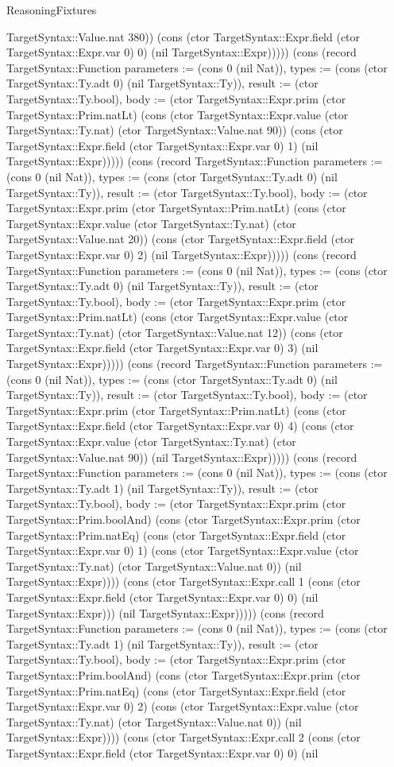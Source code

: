 \begin{lexlean}{ReasoningFixtures}
\begin{semanticmodule}
{TargetSyntax::Value.nat 380)) (cons (ctor TargetSyntax::Expr.field (ctor TargetSyntax::Expr.var 0) 0) (nil TargetSyntax::Expr))))}) (cons (record TargetSyntax::Function {parameters := (cons 0 (nil Nat)), types := (cons (ctor TargetSyntax::Ty.adt 0) (nil TargetSyntax::Ty)), result := (ctor TargetSyntax::Ty.bool), body := (ctor TargetSyntax::Expr.prim (ctor TargetSyntax::Prim.natLt) (cons (ctor TargetSyntax::Expr.value (ctor TargetSyntax::Ty.nat) (ctor TargetSyntax::Value.nat 90)) (cons (ctor TargetSyntax::Expr.field (ctor TargetSyntax::Expr.var 0) 1) (nil TargetSyntax::Expr))))}) (cons (record TargetSyntax::Function {parameters := (cons 0 (nil Nat)), types := (cons (ctor TargetSyntax::Ty.adt 0) (nil TargetSyntax::Ty)), result := (ctor TargetSyntax::Ty.bool), body := (ctor TargetSyntax::Expr.prim (ctor TargetSyntax::Prim.natLt) (cons (ctor TargetSyntax::Expr.value (ctor TargetSyntax::Ty.nat) (ctor TargetSyntax::Value.nat 20)) (cons (ctor TargetSyntax::Expr.field (ctor TargetSyntax::Expr.var 0) 2) (nil TargetSyntax::Expr))))}) (cons (record TargetSyntax::Function {parameters := (cons 0 (nil Nat)), types := (cons (ctor TargetSyntax::Ty.adt 0) (nil TargetSyntax::Ty)), result := (ctor TargetSyntax::Ty.bool), body := (ctor TargetSyntax::Expr.prim (ctor TargetSyntax::Prim.natLt) (cons (ctor TargetSyntax::Expr.value (ctor TargetSyntax::Ty.nat) (ctor TargetSyntax::Value.nat 12)) (cons (ctor TargetSyntax::Expr.field (ctor TargetSyntax::Expr.var 0) 3) (nil TargetSyntax::Expr))))}) (cons (record TargetSyntax::Function {parameters := (cons 0 (nil Nat)), types := (cons (ctor TargetSyntax::Ty.adt 0) (nil TargetSyntax::Ty)), result := (ctor TargetSyntax::Ty.bool), body := (ctor TargetSyntax::Expr.prim (ctor TargetSyntax::Prim.natLt) (cons (ctor TargetSyntax::Expr.field (ctor TargetSyntax::Expr.var 0) 4) (cons (ctor TargetSyntax::Expr.value (ctor TargetSyntax::Ty.nat) (ctor TargetSyntax::Value.nat 90)) (nil TargetSyntax::Expr))))}) (cons (record TargetSyntax::Function {parameters := (cons 0 (nil Nat)), types := (cons (ctor TargetSyntax::Ty.adt 1) (nil TargetSyntax::Ty)), result := (ctor TargetSyntax::Ty.bool), body := (ctor TargetSyntax::Expr.prim (ctor TargetSyntax::Prim.boolAnd) (cons (ctor TargetSyntax::Expr.prim (ctor TargetSyntax::Prim.natEq) (cons (ctor TargetSyntax::Expr.field (ctor TargetSyntax::Expr.var 0) 1) (cons (ctor TargetSyntax::Expr.value (ctor TargetSyntax::Ty.nat) (ctor TargetSyntax::Value.nat 0)) (nil TargetSyntax::Expr)))) (cons (ctor TargetSyntax::Expr.call 1 (cons (ctor TargetSyntax::Expr.field (ctor TargetSyntax::Expr.var 0) 0) (nil TargetSyntax::Expr))) (nil TargetSyntax::Expr))))}) (cons (record TargetSyntax::Function {parameters := (cons 0 (nil Nat)), types := (cons (ctor TargetSyntax::Ty.adt 1) (nil TargetSyntax::Ty)), result := (ctor TargetSyntax::Ty.bool), body := (ctor TargetSyntax::Expr.prim (ctor TargetSyntax::Prim.boolAnd) (cons (ctor TargetSyntax::Expr.prim (ctor TargetSyntax::Prim.natEq) (cons (ctor TargetSyntax::Expr.field (ctor TargetSyntax::Expr.var 0) 2) (cons (ctor TargetSyntax::Expr.value (ctor TargetSyntax::Ty.nat) (ctor TargetSyntax::Value.nat 0)) (nil TargetSyntax::Expr)))) (cons (ctor TargetSyntax::Expr.call 2 (cons (ctor TargetSyntax::Expr.field (ctor TargetSyntax::Expr.var 0) 0) (nil }
\end{semanticmodule}
\end{lexlean}
